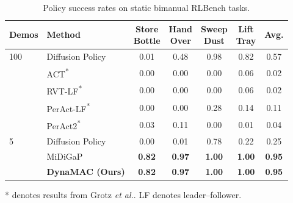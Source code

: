 \documentclass[letterpaper, 10 pt, journal, twoside]{IEEEtran}
\newcommand{\etal}{\emph{et al.}}
\newcommand{\ourmethod}{DynaMAC\xspace}
\begin{document}
%
\begin{table}
        \caption{Policy success rates on static bimanual RLBench tasks. }\label{tab:success_rates_bi}
        \centering
        \setlength{\tabcolsep}{5pt}
        \begin{threeparttable}
        \begin{tabular}{ll cccc c}
            \toprule
            \textbf{Demos}& \textbf{Method} & \makecell{Store \\ Bottle} & \makecell{Hand \\ Over} & \makecell{Sweep \\ Dust} & \makecell{Lift \\ Tray} &  Avg. \\
            \midrule
            100 & Diffusion Policy~\cite{chi2023diffusionpolicy} & 0.01 & 0.48 & 0.98 & 0.82 & 0.57 \\
            & ACT\textsuperscript{*}~\cite{zhao2023learning} & 0.00 & 0.00 & 0.00 & 0.06 & 0.02 \\
            & RVT-LF\textsuperscript{*}~\cite{grotz2024peract2} & 0.00 & 0.00 & 0.00 & 0.06 & 0.02 \\
            & PerAct-LF\textsuperscript{*}~\cite{grotz2024peract2} & 0.00 & 0.00 & 0.28 & 0.14 & 0.11\\
            & PerAct2\textsuperscript{*}~\cite{grotz2024peract2} & 0.03 & 0.11 & 0.00 & 0.01 & 0.04 \\ 
            \cmidrule{1-7}
            5 & Diffusion Policy~\cite{chi2023diffusionpolicy} & 0.00 & 0.01 & 0.78 & 0.22 & 0.25 \\
            & MiDiGaP~\cite{von2025unreasonable} & \textbf{0.82} & \textbf{0.97} &  \textbf{1.00} & \textbf{1.00} & \textbf{0.95} \\
            & \textbf{\ourmethod{} (Ours)} & \textbf{0.82} & \textbf{0.97} &  \textbf{1.00} & \textbf{1.00} & \textbf{0.95} \\
            \bottomrule
        \end{tabular}
        \begin{tablenotes}
           \footnotesize  
           {*} denotes results from Grotz \etal{}\cite{grotz2024peract2}. LF denotes leader--follower.
         \end{tablenotes}
        \end{threeparttable}
\end{table}
\end{document}
